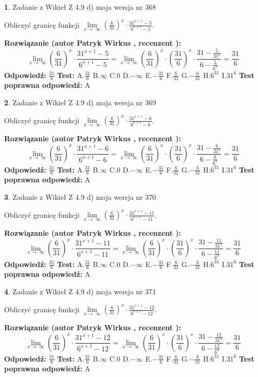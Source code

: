 \documentclass[12pt, a4paper]{article}
\theoremstyle{definition} %
\newtheorem{zad}{}
\newcommand{\zadStart}[1]{\begin{zad}#1\newline}
\newcommand{\zadStop}{\end{zad}}
\newcommand{\rozwStart}[2]{\noindent \textbf{Rozwiązanie (autor #1 , recenzent #2): }\newline}
\newcommand{\rozwStop}{\newline}
\newcommand{\odpStart}{\noindent \textbf{Odpowiedź:}\newline}
\newcommand{\odpStop}{\newline}
\newcommand{\testStart}{\noindent \textbf{Test:}\newline}
\newcommand{\testStop}{\newline}
\newcommand{\kluczStart}{\noindent \textbf{Test poprawna odpowiedź:}\newline}
\newcommand{\kluczStop}{\newline}
\begin{document}
\zadStart{Zadanie z Wikieł Z 4.9 d) moja wersja nr 368}


Obliczyć granicę funkcji  $\lim\limits_{x\to\ \infty}(\frac{6}{31})^{x}\cdot\frac{31^{x+1}-5}{6^{x+1}-5}$.
\zadStop
\rozwStart{Patryk Wirkus}{}
$$\lim\limits_{x\to\ \infty}(\frac{6}{31})^{x}\cdot\frac{31^{x+1}-5}{6^{x+1}-5}=\lim\limits_{x\to\ \infty}(\frac{6}{31})^{x}\cdot(\frac{31}{6})^{x} \cdot \frac{31-\frac{5}{31^{x}}}{6-\frac{5}{6^{x}}} = \frac{31}{6}$$
\rozwStop
\odpStart
$\frac{31}{6}$
\odpStop
\testStart
A.$\frac{31}{6}$ B.$\infty$ C.$0$ D.$-\infty$ E.$-\frac{31}{6}$
F.$\frac{6}{31}$ G.$-\frac{6}{31}$
H.$6^{31}$
I.$31^{6}$
\testStop
\kluczStart
A
\kluczStop



\zadStart{Zadanie z Wikieł Z 4.9 d) moja wersja nr 369}


Obliczyć granicę funkcji  $\lim\limits_{x\to\ \infty}(\frac{6}{31})^{x}\cdot\frac{31^{x+1}-6}{6^{x+1}-6}$.
\zadStop
\rozwStart{Patryk Wirkus}{}
$$\lim\limits_{x\to\ \infty}(\frac{6}{31})^{x}\cdot\frac{31^{x+1}-6}{6^{x+1}-6}=\lim\limits_{x\to\ \infty}(\frac{6}{31})^{x}\cdot(\frac{31}{6})^{x} \cdot \frac{31-\frac{6}{31^{x}}}{6-\frac{6}{6^{x}}} = \frac{31}{6}$$
\rozwStop
\odpStart
$\frac{31}{6}$
\odpStop
\testStart
A.$\frac{31}{6}$ B.$\infty$ C.$0$ D.$-\infty$ E.$-\frac{31}{6}$
F.$\frac{6}{31}$ G.$-\frac{6}{31}$
H.$6^{31}$
I.$31^{6}$
\testStop
\kluczStart
A
\kluczStop



\zadStart{Zadanie z Wikieł Z 4.9 d) moja wersja nr 370}


Obliczyć granicę funkcji  $\lim\limits_{x\to\ \infty}(\frac{6}{31})^{x}\cdot\frac{31^{x+1}-11}{6^{x+1}-11}$.
\zadStop
\rozwStart{Patryk Wirkus}{}
$$\lim\limits_{x\to\ \infty}(\frac{6}{31})^{x}\cdot\frac{31^{x+1}-11}{6^{x+1}-11}=\lim\limits_{x\to\ \infty}(\frac{6}{31})^{x}\cdot(\frac{31}{6})^{x} \cdot \frac{31-\frac{11}{31^{x}}}{6-\frac{11}{6^{x}}} = \frac{31}{6}$$
\rozwStop
\odpStart
$\frac{31}{6}$
\odpStop
\testStart
A.$\frac{31}{6}$ B.$\infty$ C.$0$ D.$-\infty$ E.$-\frac{31}{6}$
F.$\frac{6}{31}$ G.$-\frac{6}{31}$
H.$6^{31}$
I.$31^{6}$
\testStop
\kluczStart
A
\kluczStop



\zadStart{Zadanie z Wikieł Z 4.9 d) moja wersja nr 371}


Obliczyć granicę funkcji  $\lim\limits_{x\to\ \infty}(\frac{6}{31})^{x}\cdot\frac{31^{x+1}-12}{6^{x+1}-12}$.
\zadStop
\rozwStart{Patryk Wirkus}{}
$$\lim\limits_{x\to\ \infty}(\frac{6}{31})^{x}\cdot\frac{31^{x+1}-12}{6^{x+1}-12}=\lim\limits_{x\to\ \infty}(\frac{6}{31})^{x}\cdot(\frac{31}{6})^{x} \cdot \frac{31-\frac{12}{31^{x}}}{6-\frac{12}{6^{x}}} = \frac{31}{6}$$
\rozwStop
\odpStart
$\frac{31}{6}$
\odpStop
\testStart
A.$\frac{31}{6}$ B.$\infty$ C.$0$ D.$-\infty$ E.$-\frac{31}{6}$
F.$\frac{6}{31}$ G.$-\frac{6}{31}$
H.$6^{31}$
I.$31^{6}$
\testStop
\kluczStart
A
\kluczStop
\end{document}
